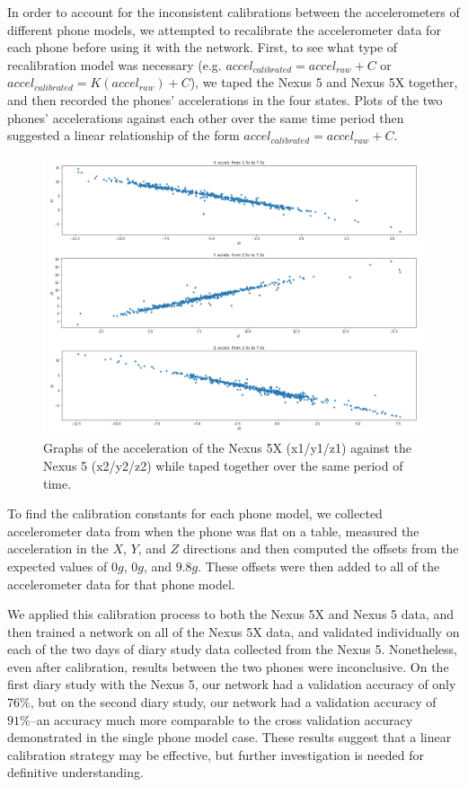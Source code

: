 In order to account for the inconsistent calibrations between the accelerometers of different phone models, we
attempted to recalibrate the accelerometer data for each phone before using it with the network. 
First, to see what type of recalibration model was necessary (e.g. $accel_{calibrated} = accel_{raw} + C$ or
$accel_{calibrated} = K(accel_{raw}) + C$), we taped the Nexus 5 and Nexus 5X together, and then recorded
the phones' accelerations in the four states. Plots of the two phones' accelerations against each other over the same time period
then suggested a linear relationship of the form $accel_{calibrated} = accel_{raw} + C$. 

\begin{figure}[t]
\center
\includegraphics[scale=0.5]{two_phones}
\caption{Graphs of the acceleration of the Nexus 5X (x1/y1/z1) against the Nexus 5 (x2/y2/z2) while taped together over the same period of time.}
\end{figure}

To find the calibration constants for each phone model, we collected accelerometer
data from when the phone was flat on a table, measured the acceleration in the
$X$, $Y$, and $Z$ directions and then computed the offsets from the expected values of
$0g$, $0g$, and $9.8g$. These offsets were then added to all of the accelerometer data for that phone model.

We applied this calibration process to both the Nexus 5X and Nexus 5 data, and then
trained a network on all of the Nexus 5X data, and validated individually on each of the 
two days of diary study data collected from the Nexus 5.
Nonetheless, even after calibration, results between the two phones were inconclusive. 
On the first diary study with the Nexus 5, our network
had a validation accuracy of only $76\%$, but on the second diary study, our network had a validation
accuracy of $91\%$--an accuracy much more comparable to the cross validation accuracy
demonstrated in the single phone model case. These results suggest that a linear calibration
strategy may be effective, but further investigation is needed for definitive understanding.

